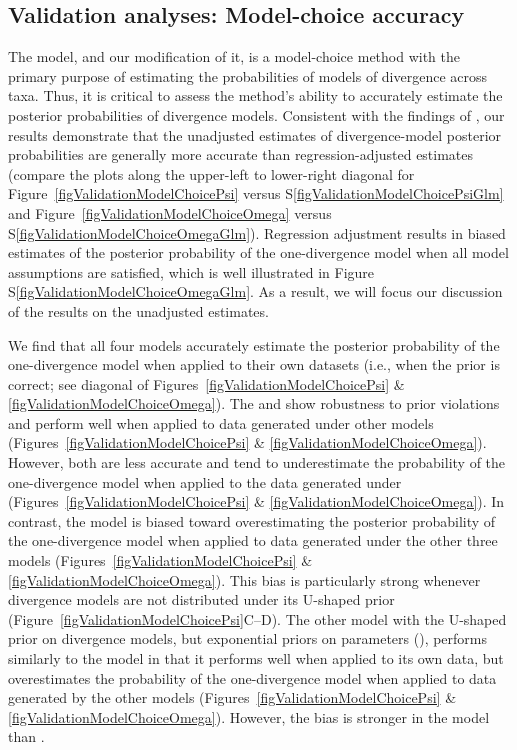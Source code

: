 \subsection*{Validation analyses: Model-choice accuracy}
The \msb model, and our modification of it, is a model-choice method
with the primary purpose of estimating the probabilities of models
of divergence across taxa.
Thus, it is critical to assess the method's ability to accurately
estimate the posterior probabilities of divergence models.
Consistent with the findings of \citet{Oaks2012}, our results demonstrate that
the unadjusted estimates of divergence-model posterior probabilities are
generally more accurate than regression-adjusted estimates
(compare the plots along the upper-left to lower-right diagonal for
Figure~\ref{figValidationModelChoicePsi} versus
S\ref{figValidationModelChoicePsiGlm} and
Figure~\ref{figValidationModelChoiceOmega} versus
S\ref{figValidationModelChoiceOmegaGlm}).
Regression adjustment results in biased estimates of the posterior probability
of the one-divergence model when all model assumptions are satisfied, which is
well illustrated in Figure S\ref{figValidationModelChoiceOmegaGlm}.
As a result, we will focus our discussion of the results on the unadjusted
estimates.

We find that all four models accurately estimate the posterior probability of
the one-divergence model when applied to their own datasets (i.e., when the
prior is correct; see diagonal of Figures~\ref{figValidationModelChoicePsi} \&
\ref{figValidationModelChoiceOmega}).
The \modelUniform and \modelDPP show robustness to prior violations and
perform well when applied to data generated under other models
(Figures~\ref{figValidationModelChoicePsi} \&
\ref{figValidationModelChoiceOmega}).
However, both are less accurate and tend to underestimate the probability of the
one-divergence model when applied to the data generated under \modelUshaped
(Figures~\ref{figValidationModelChoicePsi} \&
\ref{figValidationModelChoiceOmega}).
In contrast, the \modelOld model is biased toward overestimating the posterior
probability of the one-divergence model when applied to data generated under
the other three models
(Figures~\ref{figValidationModelChoicePsi} \&
\ref{figValidationModelChoiceOmega}).
This bias is particularly strong whenever divergence models are not
distributed under its U-shaped prior
(Figure~\ref{figValidationModelChoicePsi}C--D).
The other model with the U-shaped prior on divergence models, but exponential
priors on parameters (\modelUshaped), performs similarly to the \modelOld model
in that it performs well when applied to its own data, but overestimates the
probability of the one-divergence model when applied to data generated by the
other models
(Figures~\ref{figValidationModelChoicePsi} \&
\ref{figValidationModelChoiceOmega}).
However, the bias is stronger in the \modelOld model than \modelUshaped.

